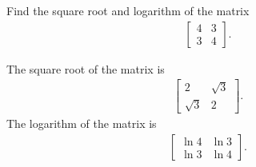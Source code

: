 \documentclass[en]{sol-man}
\begin{document}
\begin{exe}
    Find the square root and logarithm of the matrix
    \begin{align}
        \left[\begin{matrix}
            4&3\\
            3&4
        \end{matrix}\right].
    \end{align}
\end{exe}
\begin{sol}
    The square root of the matrix is
    \begin{align}
        \left[\begin{matrix}
            2&\sqrt{3}\\
            \sqrt{3}&2
        \end{matrix}\right].
    \end{align}
    The logarithm of the matrix is
    \begin{align}
        \left[\begin{matrix}
            \ln 4&\ln 3\\
            \ln 3&\ln 4
        \end{matrix}\right].
    \end{align}
\end{sol}
\end{document}
